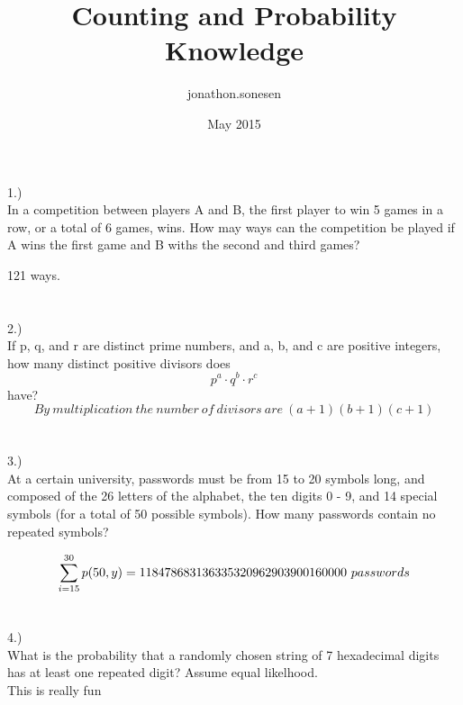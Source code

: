 \documentclass[fleqn]{article}
\title{Counting and Probability Knowledge}
\author{jonathon.sonesen }
\date{May 2015}
\begin{document}
\maketitle
\section*{}
1.)\\
In a competition between players A and B, the first player to win 5 games
in a row, or a total of 6 games, wins. How may ways can the competition be
played if A wins the first game and B withs the second and third games?

121 ways.
\section*{}
2.)\\
If p, q, and r are distinct prime numbers, and a, b, and c are positive integers,
how many distinct positive divisors does 
\begin{equation*}p^a \cdot q^b \cdot r^c \end{equation*} have?
\begin{equation*}
  By~multiplication~the~number~of~divisors~are~ (a+1)(b+1)(c+1)
\end{equation*}

 
\section*{}
3.)\\
At a certain university, passwords must be from 15 to 20 symbols long, and
composed of the 26 letters of the alphabet, the ten digits 0 - 9, and 14 special
symbols (for a total of 50 possible symbols). How many passwords contain
no repeated symbols?

\begin{equation*}
  \sum\limits_{i=15}^{30}p(50,y)
  = 118478683136335320962903900160000~passwords\\
\end{equation*}

 
\section*{}
4.)\\
What is the probability that a randomly chosen string of 7 hexadecimal digits 
has at least one repeated digit? Assume equal likelhood.\\
This is really fun
\end{document}
